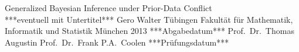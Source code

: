 \documentclass[12pt]{book}
\begin{document}
  \frontmatter


  \LMUTitle
      {Generalized Bayesian Inference under Prior-Data Conflict\\
       ***eventuell mit Untertitel***}         %
      {Gero Walter     }                       %
      {T\"ubingen}                             %
      {Fakult\"at f\"ur Mathematik, Informatik und Statistik} %
      {M\"unchen 2013}                         %
      {***Abgabedatum***}                            %
      {Prof.\ Dr.\ Thomas Augustin}            %
      {Prof.\ Dr.\ Frank P.A.\ Coolen}         %
      {***Pr\"ufungsdatum***}                  %


  \tableofcontents

  \listoffigures

  \listoftables
  \cleardoublepage

  

  

  

\mainmatter\setcounter{page}{1}
  
  
  
  \begin{appendix}
  
%  
  \end{appendix}


  \backmatter

  
  



%  
\end{document}
